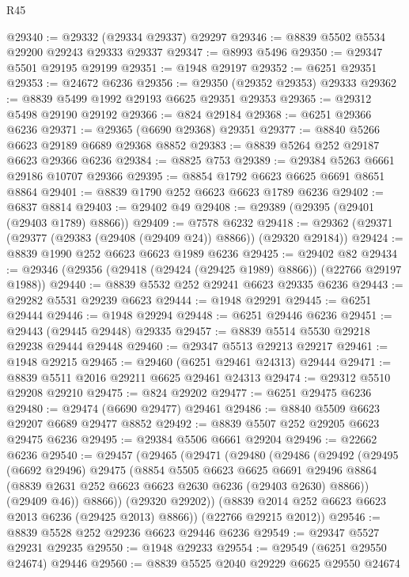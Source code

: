 \begin{lexlean}{R45}
\begin{coremodule}
{@29340 := @29332 (@29334 @29337) @29297
@29346 := @8839 @5502 @5534 @29200 @29243 @29333 @29337
@29347 := @8993 @5496
@29350 := @29347 @5501 @29195 @29199
@29351 := @1948 @29197
@29352 := @6251 @29351
@29353 := @24672 @6236
@29356 := @29350 (@29352 @29353) @29333
@29362 := @8839 @5499 @1992 @29193 @6625 @29351 @29353
@29365 := @29312 @5498 @29190 @29192
@29366 := @824 @29184
@29368 := @6251 @29366 @6236
@29371 := @29365 (@6690 @29368) @29351
@29377 := @8840 @5266 @6623 @29189 @6689 @29368 @8852
@29383 := @8839 @5264 @252 @29187 @6623 @29366 @6236
@29384 := @8825 @753
@29389 := @29384 @5263 @6661 @29186 @10707 @29366
@29395 := @8854 @1792 @6623 @6625 @6691 @8651 @8864
@29401 := @8839 @1790 @252 @6623 @6623 @1789 @6236
@29402 := @6837 @8814
@29403 := @29402 @49
@29408 := @29389 (@29395 (@29401 (@29403 @1789) @8866))
@29409 := @7578 @6232
@29418 := @29362 (@29371 (@29377 (@29383 (@29408 (@29409 @24)) @8866)) (@29320 @29184))
@29424 := @8839 @1990 @252 @6623 @6623 @1989 @6236
@29425 := @29402 @82
@29434 := @29346 (@29356 (@29418 (@29424 (@29425 @1989) @8866)) (@22766 @29197 @1988))
@29440 := @8839 @5532 @252 @29241 @6623 @29335 @6236
@29443 := @29282 @5531 @29239 @6623
@29444 := @1948 @29291
@29445 := @6251 @29444
@29446 := @1948 @29294
@29448 := @6251 @29446 @6236
@29451 := @29443 (@29445 @29448) @29335
@29457 := @8839 @5514 @5530 @29218 @29238 @29444 @29448
@29460 := @29347 @5513 @29213 @29217
@29461 := @1948 @29215
@29465 := @29460 (@6251 @29461 @24313) @29444
@29471 := @8839 @5511 @2016 @29211 @6625 @29461 @24313
@29474 := @29312 @5510 @29208 @29210
@29475 := @824 @29202
@29477 := @6251 @29475 @6236
@29480 := @29474 (@6690 @29477) @29461
@29486 := @8840 @5509 @6623 @29207 @6689 @29477 @8852
@29492 := @8839 @5507 @252 @29205 @6623 @29475 @6236
@29495 := @29384 @5506 @6661 @29204
@29496 := @22662 @6236
@29540 := @29457
    (@29465
      (@29471
        (@29480
          (@29486
            (@29492
              (@29495
                (@6692 @29496)
                @29475
                (@8854
                  @5505
                  @6623
                  @6625
                  @6691
                  @29496
                  @8864
                  (@8839 @2631 @252 @6623 @6623 @2630 @6236 (@29403 @2630) @8866))
                (@29409 @46))
              @8866))
          (@29320 @29202))
        (@8839 @2014 @252 @6623 @6623 @2013 @6236 (@29425 @2013) @8866))
      (@22766 @29215 @2012))
@29546 := @8839 @5528 @252 @29236 @6623 @29446 @6236
@29549 := @29347 @5527 @29231 @29235
@29550 := @1948 @29233
@29554 := @29549 (@6251 @29550 @24674) @29446
@29560 := @8839 @5525 @2040 @29229 @6625 @29550 @24674
}
\end{coremodule}
\end{lexlean}
